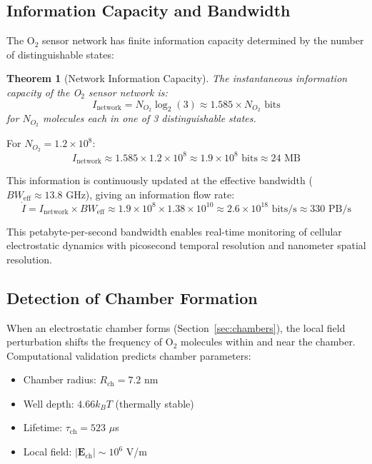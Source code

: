 \documentclass[twocolumn,10pt,aps,prd,superscriptaddress,floatfix,nofootinbib]{revtex4-2}
\newtheorem{theorem}{Theorem}[section]
\theoremstyle{remark}
\begin{document}
\subsection{Information Capacity and Bandwidth}

The O$_2$ sensor network has finite information capacity determined by the number of distinguishable states:

\begin{theorem}[Network Information Capacity]
\label{thm:information_capacity}
The instantaneous information capacity of the O$_2$ sensor network is:
\begin{equation}
I_{\mathrm{network}} = N_{O_2} \log_2(3) \approx 1.585 \times N_{O_2} \text{ bits}
\label{eq:information_capacity}
\end{equation}
for $N_{O_2}$ molecules each in one of 3 distinguishable states.
\end{theorem}

For $N_{O_2} = 1.2 \times 10^{8}$:
\begin{equation}
I_{\mathrm{network}} \approx 1.585 \times 1.2 \times 10^{8} \approx 1.9 \times 10^{8} \text{ bits} \approx 24 \text{ MB}
\end{equation}

This information is continuously updated at the effective bandwidth ($BW_{\mathrm{eff}} \approx 13.8$ GHz), giving an information flow rate:
\begin{equation}
\dot{I} = I_{\mathrm{network}} \times BW_{\mathrm{eff}} \approx 1.9 \times 10^{8} \times 1.38 \times 10^{10} \approx 2.6 \times 10^{18} \text{ bits/s} \approx 330 \text{ PB/s}
\end{equation}

This petabyte-per-second bandwidth enables real-time monitoring of cellular electrostatic dynamics with picosecond temporal resolution and nanometer spatial resolution.

\subsection{Detection of Chamber Formation}

When an electrostatic chamber forms (Section~\ref{sec:chambers}), the local field perturbation shifts the frequency of O$_2$ molecules within and near the chamber. Computational validation predicts chamber parameters:

\begin{itemize}
\item Chamber radius: $R_{\mathrm{ch}} = 7.2$ nm
\item Well depth: $4.66 k_B T$ (thermally stable)
\item Lifetime: $\tau_{\mathrm{ch}} = 523$ $\mu$s
\item Local field: $|\mathbf{E}_{\mathrm{ch}}| \sim 10^6$ V/m
\end{itemize}
\end{document}
